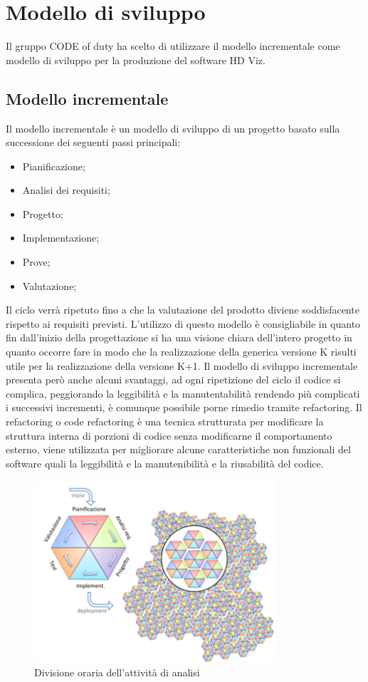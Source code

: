 \section{Modello di sviluppo}
Il gruppo CODE of duty ha scelto di utilizzare il modello incrementale come modello di sviluppo per la produzione del software HD Viz.
\subsection{Modello incrementale}
Il modello incrementale è un modello di sviluppo di un progetto basato sulla successione dei seguenti passi principali:
\begin{itemize}
	\item Pianificazione;
	\item Analisi dei requisiti;
	\item Progetto;
	\item Implementazione;
	\item Prove;
	\item Valutazione;
\end{itemize}
Il ciclo verrà ripetuto fino a che la valutazione del prodotto diviene soddisfacente rispetto ai requisiti previsti.
L'utilizzo di questo modello è consigliabile in quanto fin dall'inizio della progettazione si ha una visione chiara 
dell'intero progetto in quanto occorre fare in modo che la realizzazione della generica versione K risulti utile per 
la realizzazione della versione K+1.
Il modello di sviluppo incrementale presenta però anche alcuni svantaggi, ad ogni ripetizione del ciclo il codice si complica, 
peggiorando la leggibilità e la manutentabilità rendendo più complicati i successivi incrementi, è comunque possibile porne rimedio tramite refactoring.
Il refactoring o code refactoring è una tecnica strutturata per modificare la struttura interna di porzioni di codice senza modificarne
il comportamento esterno, viene utilizzata per migliorare alcune caratteristiche non funzionali del software quali la leggibilità e la manutenibilità e la riusabilità del codice.
\begin{figure}[H]
        \centering
        \includegraphics[width=0.8\textwidth]{source/img/modelloincrementale.png}
        \caption{Divisione oraria dell'attività di analisi}
\end{figure}